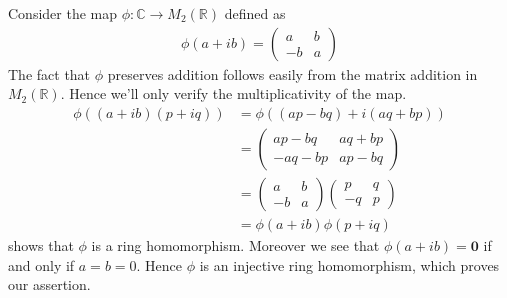 \documentclass[12pt]{exam}
\theoremstyle{plain} %
\theoremstyle{definition} %
\theoremstyle{remark} %
\begin{document}
\begin{questions}
  \question
  \begin{solution}
    Consider the map $\phi: \mathbb{C} \to M_2(\mathbb{R})$ defined as
    \begin{align*}
      \phi(a + ib) =
      \begin{pmatrix}%
        a & b \\
        -b & a
      \end{pmatrix}
    \end{align*}
    The fact that $\phi$ preserves addition follows easily from the
    matrix addition in $M_2(\mathbb{R})$. Hence we'll only verify the
    multiplicativity of the map.
    \begin{align*}
      \phi((a + ib)(p + iq)) &= \phi((ap - bq) + i(aq + bp))  \\
      &=
      \begin{pmatrix}%
        ap - bq & aq + bp \\
        - aq - bp & ap - bq
      \end{pmatrix} \\
      &=
      \begin{pmatrix}%
        a & b \\
        -b & a
      \end{pmatrix}
      \begin{pmatrix}%
        p & q \\
        -q & p
      \end{pmatrix} \\
      & = \phi(a + ib) \phi(p + iq)
    \end{align*}
    shows that $\phi$ is a ring homomorphism. Moreover we see that
    $\phi(a + ib) = \textbf{0}$ if and only if $a = b = 0$. Hence
    $\phi$ is an injective ring homomorphism, which proves our assertion.
  \end{solution}

  \question
  \begin{solution}
\end{solution}
\end{questions}
\end{document}
